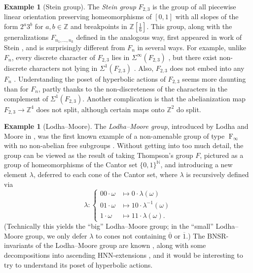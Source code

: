 \documentclass[reqno,12pt]{amsart}\setcounter{tocdepth}{1}
\theoremstyle{definition}
\newtheorem{example}[theorem]{Example}
\newcommand{\N}{\mathbb{N}}
\newcommand{\Z}{\mathbb{Z}}
\DeclareMathOperator{\F}{F}
\numberwithin{equation}{section}
\begin{document}
\begin{example}[Stein group]
The \emph{Stein group} $F_{2,3}$ is the group of all piecewise linear orientation preserving homeomorphisms of $[0,1]$ with all slopes of the form $2^a 3^b$ for $a,b\in\Z$ and breakpoints in $\Z[\frac{1}{6}]$. This group, along with the generalizations $F_{n_1,\ldots,n_k}$ defined in the analogous way, first appeared in work of Stein \cite{stein92}, and is surprisingly different from $F_n$ in several ways. For example, unlike $F_n$, every discrete character of $F_{2,3}$ lies in $\Sigma^\infty(F_{2,3})$ \cite{spahn21}, but there exist non-discrete characters not lying in $\Sigma^1(F_{2,3})$ \cite{bieri87}. Also, $F_{2,3}$ does not embed into any $F_n$ \cite{lodha20}. Understanding the poset of hyperbolic actions of $F_{2,3}$ seems more daunting than for $F_n$, partly thanks to the non-discreteness of the characters in the complement of $\Sigma^1(F_{2,3})$. Another complication is that the abelianization map $F_{2,3}\to\Z^4$ does not split, although certain maps onto $\Z^2$ do split.
\end{example}

\begin{example}[Lodha--Moore]
The \emph{Lodha--Moore group}, introduced by Lodha and Moore in \cite{lodha16}, was the first known example of a non-amenable group of type $\F_\infty$ with no non-abelian free subgroups \cite{lodha16,lodhaFinfty}. Without getting into too much detail, the group can be viewed as the result of taking Thompson's group $F$, pictured as a group of homeomorphisms of the Cantor set $\{0,1\}^\N$, and introducing a new element $\lambda$, deferred to each cone of the Cantor set, where $\lambda$ is recursively defined via
\[
\lambda \colon \left\{\begin{array}{ll}
    00\cdot\omega &\mapsto 0\cdot \lambda(\omega)\\
    01\cdot\omega &\mapsto 10\cdot \lambda^{-1}(\omega)\\
    1\cdot\omega &\mapsto 11\cdot \lambda(\omega)\text{.}
\end{array}\right.
\]
(Technically this yields the ``big'' Lodha--Moore group; in the ``small'' Lodha--Moore group, we only defer $\lambda$ to cones not containing $\overline{0}$ or $\overline{1}$.) The BNSR-invariants of the Lodha--Moore group are known \cite{lodha23}, along with some decompositions into ascending HNN-extensions \cite{zaremsky16}, and it would be interesting to try to understand its poset of hyperbolic actions.
\end{example}
\end{document}
